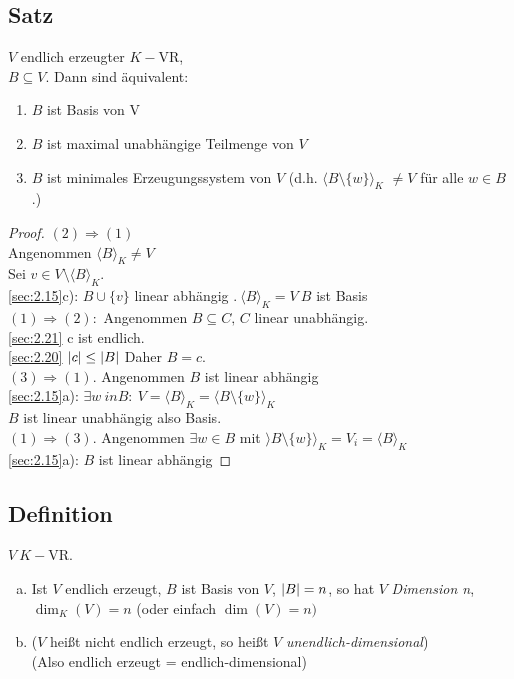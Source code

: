 \subsection{Satz}\label{sec:2.22}
$V$ endlich erzeugter $K-$VR,\\
$B \subseteq V.$ Dann sind äquivalent:
\begin{enumerate}[(1)]
\item $B$ ist Basis von V
\item $B$ ist maximal unabhängige Teilmenge von $V$
\item $B$ ist minimales Erzeugungssystem von $V$ (d.h. $\langle B \setminus \{w\}\rangle_K$ $\ne V$ für alle $w \in B$.)
\end{enumerate}
\begin{proof}
$(2) \Rightarrow (1)$\\
Angenommen $\langle B \rangle_K \ne V$\\
Sei $v \in V \setminus \langle B \rangle_K$.\\
\ref{sec:2.15}c): $B \cup \{v\}$ linear abhängig \Lightning$.\ \langle B \rangle_K = V\ B$ ist Basis\\
$(1) \Rightarrow (2):$ Angenommen $B \subseteq C,\, C$ linear unabhängig.\\
\ref{sec:2.21} c ist endlich.\\
\ref{sec:2.20} $\lvert c \rvert \leq \lvert B \rvert$ Daher $B = c$.\\
$(3) \Rightarrow (1)$. Angenommen $B$ ist linear abhängig\\
\ref{sec:2.15}a): $\exists w\ in B:\: V = \langle B \rangle_K = \langle B \setminus \{w\}\rangle_K $\Lightning\\
$B$ ist linear unabhängig also Basis.\\
$(1) \Rightarrow (3)$. Angenommen $\exists w \in B$ mit $\rangle B \setminus \{w\}\rangle_K = V_i = \langle B \rangle_K$\\
\ref{sec:2.15}a): $B$ ist linear abhängig \Lightning
\end{proof}
\subsection{Definition}\label{sec:2.23}
$V\ K-$VR.
\begin{enumerate}[a)]
\item Ist $V$ endlich erzeugt, $B$ ist Basis von $V$, $\lvert B \rvert = n$, so hat $V$ \emph{Dimension n},\\
$\dim_K(V) = n$ (oder einfach $\dim(V) = n)$
\item ($V$ hei\ss t nicht endlich erzeugt, so hei\ss t $V$ \emph{unendlich-dimensional})\\
(Also endlich erzeugt = endlich-dimensional)
\end{enumerate}

